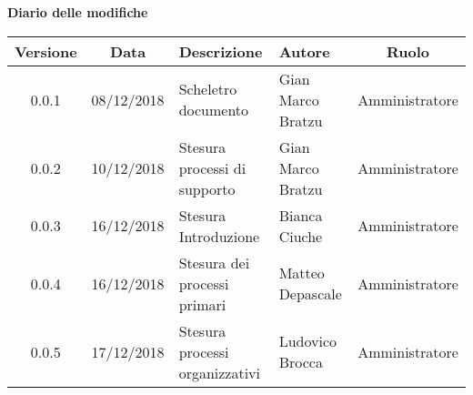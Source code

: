 	\begin{center}
		\textbf{Diario delle modifiche}
	\end{center}
	\begin{center}
		\begin{tabularx}{\textwidth}{|c|c|X|X|c|}
			\hline
			\textbf{Versione} & \textbf{Data} & \textbf{Descrizione} & \textbf{Autore} & \textbf{Ruolo} \\
			\hline
			0.0.1 & 08/12/2018 & Scheletro documento  & Gian Marco Bratzu & Amministratore\\
			\hline
			0.0.2 & 10/12/2018 & Stesura processi di supporto & Gian Marco Bratzu & Amministratore\\	
			\hline
			0.0.3 & 16/12/2018 & Stesura Introduzione & Bianca Ciuche & Amministratore\\
			\hline
			0.0.4 & 16/12/2018 & Stesura dei processi primari & Matteo Depascale & Amministratore\\
			\hline
			0.0.5 & 17/12/2018 & Stesura processi organizzativi & Ludovico Brocca & Amministratore\\
			\hline
		\end{tabularx}
	\end{center}

\newpage
